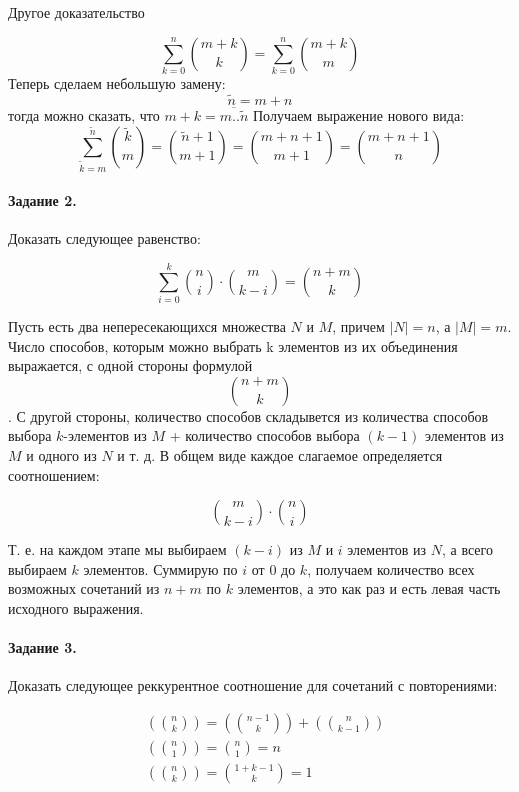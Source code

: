 Другое доказательство

\begin{Proof}
	\[
		\sum_{k=0}^n \binom{m+k}{k} = \sum_{k=0}^n \binom{m+k}{m}
	\]
	Теперь сделаем небольшую замену:
	\[\tilde n = m + n\] тогда можно сказать, что $m+k = \overline{m .. \tilde n}$ Получаем выражение нового вида:
	\[
		\sum_{\tilde k=m}^{\tilde n} \binom{\tilde k}{m} = \binom{\tilde n + 1}{m + 1} = \binom{m + n + 1}{m + 1} = \binom{m+n+1}{n}
	\]
\end{Proof}

\paragraph{Задание 2.} Доказать следующее равенство:

\begin{equation}
	\sum_{i=0}^k \binom{n}{i} \cdot \binom{m}{k-i} = \binom{n+m}{k}
\end{equation}

\begin{Proof}
	Пусть есть два непересекающихся множества $N$ и $M$, причем $\left| N \right| = n$, а $ \left| M \right| = m $. Число способов, которым можно выбрать k элементов из их объединения выражается, с одной стороны формулой \[\binom{n+m}{k}\]. С другой стороны, количество способов складывется из количества способов выбора $k$-элементов из $M$ + количество способов выбора $(k-1)$ элементов из $M$ и одного из $N$ и т. д. В общем виде каждое слагаемое определяется соотношением:

	\[
		\binom{m}{k-i} \cdot \binom{n}{i}
	\]

	Т. е. на каждом этапе мы выбираем $(k-i)$ из $M$ и $i$ элементов из $N$, а всего выбираем $k$ элементов. Суммирую по $i$ от $0$ до $k$, получаем количество всех возможных сочетаний из $n+m$ по $k$ элементов, а это как раз и есть левая часть исходного выражения.
\end{Proof}

\paragraph{Задание 3.} Доказать следующее реккурентное соотношение для сочетаний с повторениями:

\begin{equation}
	\begin{split}
		& \left( \binom{n}{k} \right) = \left( \binom{n-1}{k} \right) + \left( \binom{n}{k-1} \right) \\
		& \left( \binom{n}{1} \right) = \binom{n}{1} = n \\
		& \left( \binom{n}{k} \right) = \binom{1 + k - 1}{k} = 1
	\end{split}
\end{equation}

